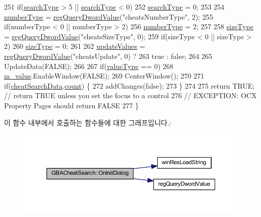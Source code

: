 \begin{DoxyCode}
251   \textcolor{keywordflow}{if}(\mbox{\hyperlink{class_g_b_a_cheat_search_a708b5bbf00916b2ff173eb07273b1db5}{searchType}} > 5 || \mbox{\hyperlink{class_g_b_a_cheat_search_a708b5bbf00916b2ff173eb07273b1db5}{searchType}} < 0)
252     \mbox{\hyperlink{class_g_b_a_cheat_search_a708b5bbf00916b2ff173eb07273b1db5}{searchType}} = 0;
253   
254   \mbox{\hyperlink{class_g_b_a_cheat_search_a5f4137be5a232d58a5cf4e03c72b008c}{numberType}} = \mbox{\hyperlink{_reg_8cpp_a150640889ffff4851ee26d7b999ec7c3}{regQueryDwordValue}}(\textcolor{stringliteral}{"cheatsNumberType"}, 2);
255   \textcolor{keywordflow}{if}(numberType < 0 || numberType > 2)
256     \mbox{\hyperlink{class_g_b_a_cheat_search_a5f4137be5a232d58a5cf4e03c72b008c}{numberType}} = 2;
257   
258   \mbox{\hyperlink{class_g_b_a_cheat_search_a9fc543b94f045d8c778cf921c06cc2c3}{sizeType}} = \mbox{\hyperlink{_reg_8cpp_a150640889ffff4851ee26d7b999ec7c3}{regQueryDwordValue}}(\textcolor{stringliteral}{"cheatsSizeType"}, 0);
259   \textcolor{keywordflow}{if}(sizeType < 0 || sizeType > 2)
260     \mbox{\hyperlink{class_g_b_a_cheat_search_a9fc543b94f045d8c778cf921c06cc2c3}{sizeType}} = 0;
261   
262   \mbox{\hyperlink{class_g_b_a_cheat_search_a1b8eec1d7b81c1e297b71c4de071550f}{updateValues}} = \mbox{\hyperlink{_reg_8cpp_a150640889ffff4851ee26d7b999ec7c3}{regQueryDwordValue}}(\textcolor{stringliteral}{"cheatsUpdate"}, 0) ?
263     true : \textcolor{keyword}{false};
264 
265   UpdateData(FALSE);
266 
267   \textcolor{keywordflow}{if}(\mbox{\hyperlink{class_g_b_a_cheat_search_a633f5b523a814d3f1e4cb06b1799b798}{valueType}} == 0)
268     \mbox{\hyperlink{class_g_b_a_cheat_search_aaff3a33037e3561aadfdfe905c66148f}{m\_value}}.EnableWindow(FALSE);
269   CenterWindow();
270 
271   \textcolor{keywordflow}{if}(\mbox{\hyperlink{_cheat_search_8cpp_aeeb4f5916a0f16b1bb45e57aa2cc58d4}{cheatSearchData}}.\mbox{\hyperlink{struct_cheat_search_data_a4c4d3092ddaff068d820c28067b15774}{count}}) \{
272     addChanges(\textcolor{keyword}{false});
273   \}
274   
275   \textcolor{keywordflow}{return} TRUE;  \textcolor{comment}{// return TRUE unless you set the focus to a control}
276                 \textcolor{comment}{// EXCEPTION: OCX Property Pages should return FALSE}
277 \}
\end{DoxyCode}
이 함수 내부에서 호출하는 함수들에 대한 그래프입니다.\+:
\nopagebreak
\begin{figure}[H]
\begin{center}
\leavevmode
\includegraphics[width=350pt]{class_g_b_a_cheat_search_a29ff71ddc116276ad183d91e93d69426_cgraph}
\end{center}
\end{figure}
